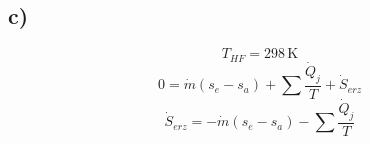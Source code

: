 

\subsection*{c)}
\[
T_{HF} = 298 \, \text{K}
\]
\[
0 = \dot{m} \left( s_e - s_a \right) + \sum \frac{\dot{Q}_j}{T} + \dot{S}_{erz}
\]
\[
\dot{S}_{erz} = -\dot{m} \left( s_e - s_a \right) - \sum \frac{\dot{Q}_j}{T}
\]